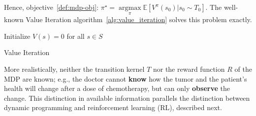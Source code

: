 Hence, objective~\ref{def:mdp-obj}: $\pi^{\star} = \underset{\pi}{\operatorname{argmax}}\mathbb{E}\left[V^{\pi}(s_0)|s_0\sim T_0 \right]$.
The well-known Value Iteration algorithm~\ref{alg:value_iteration} solves this problem exactly. 

\begin{algorithm}
    Initialize $V(s) = 0$ for all $s \in S$ \\
    \caption{Value Iteration}\label{alg:value_iteration}
\end{algorithm}

More realistically, neither the transition kernel $T$ nor the reward function $R$ of the MDP are known; e.g., the doctor cannot \textbf{know} how the tumor and the patient's health will change after a dose of chemotherapy, but can only \textbf{observe} the change.
This distinction in available information parallels the distinction between dynamic programming and reinforcement learning (RL), described next. 

